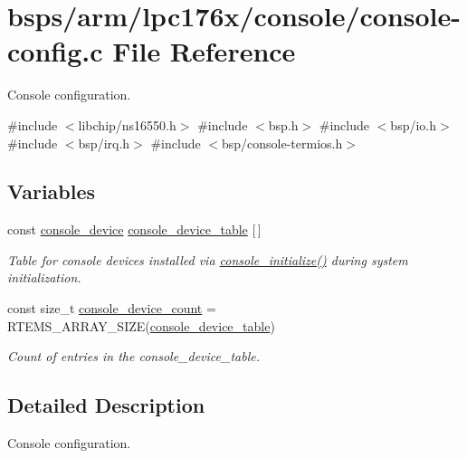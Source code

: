 \hypertarget{arm_2lpc176x_2console_2console-config_8c}{}\section{bsps/arm/lpc176x/console/console-\/config.c File Reference}
\label{arm_2lpc176x_2console_2console-config_8c}


Console configuration.  


{\ttfamily \#include $<$libchip/ns16550.\+h$>$}\newline
{\ttfamily \#include $<$bsp.\+h$>$}\newline
{\ttfamily \#include $<$bsp/io.\+h$>$}\newline
{\ttfamily \#include $<$bsp/irq.\+h$>$}\newline
{\ttfamily \#include $<$bsp/console-\/termios.\+h$>$}\newline
\subsection*{Variables}
\begin{DoxyCompactItemize}
\item 
const \mbox{\hyperlink{structconsole__device}{console\+\_\+device}} \mbox{\hyperlink{group__ConsoleTermios_ga7f058e756eb724397922b823131fba5c}{console\+\_\+device\+\_\+table}} \mbox{[}$\,$\mbox{]}
\begin{DoxyCompactList}\small\item\em Table for console devices installed via \mbox{\hyperlink{arm_2raspberrypi_2console_2console-config_8c_a4bdc321ef3ab62a261d77b5dbe075566}{console\+\_\+initialize()}} during system initialization. \end{DoxyCompactList}\item 
const size\+\_\+t \mbox{\hyperlink{group__ConsoleTermios_gabca2c9c9873b0482f9fd306e6bade017}{console\+\_\+device\+\_\+count}} = R\+T\+E\+M\+S\+\_\+\+A\+R\+R\+A\+Y\+\_\+\+S\+I\+ZE(\mbox{\hyperlink{group__ConsoleTermios_ga7f058e756eb724397922b823131fba5c}{console\+\_\+device\+\_\+table}})
\begin{DoxyCompactList}\small\item\em Count of entries in the console\+\_\+device\+\_\+table. \end{DoxyCompactList}\end{DoxyCompactItemize}


\subsection{Detailed Description}
Console configuration. 

